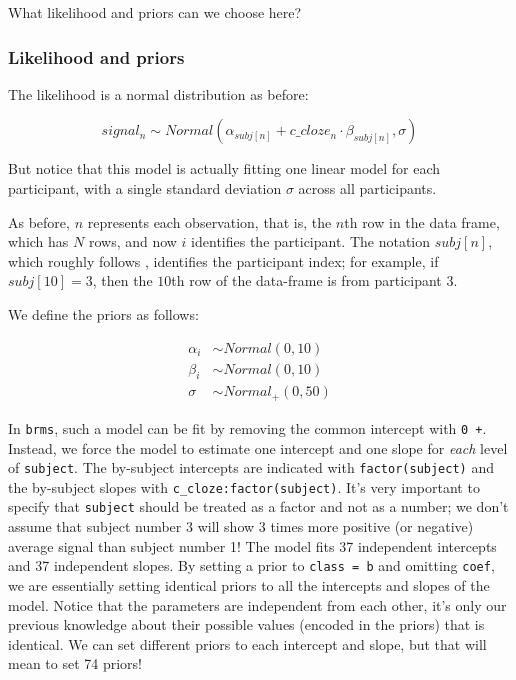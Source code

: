 \documentclass[12pt,]{krantz}
\theoremstyle{definition}
\theoremstyle{definition}
\theoremstyle{definition}
\theoremstyle{remark}
\begin{document}
What likelihood and priors can we choose here?

\hypertarget{likelihood-and-priors-2}{%
\subsubsection{Likelihood and priors}\label{likelihood-and-priors-2}}

The likelihood is a normal distribution as before:

\begin{equation}
 signal_n \sim Normal( \alpha_{subj[n]} + c\_cloze_n \cdot \beta_{subj[n]},\sigma)
 \end{equation}

But notice that this model is actually fitting one linear model for each participant, with a single standard deviation \(\sigma\) across all participants.

As before, \(n\) represents each observation, that is, the \(n\)th row in the data frame, which has \(N\) rows, and now \(i\) identifies the participant. The notation \(subj[n]\), which roughly follows \citet{GelmanHill2007}, identifies the participant index; for example, if \(subj[10]=3\), then the \(10\)th row of the data-frame is from participant \(3\).

We define the priors as follows:

\begin{equation}
 \begin{aligned}
 \alpha_i &\sim Normal(0,10)\\
 \beta_i  &\sim Normal(0,10)\\
 \sigma  &\sim Normal_+(0,50)
 \end{aligned}
 \end{equation}

In \texttt{brms}, such a model can be fit by removing the common intercept with \texttt{0\ +}. Instead, we force the model to estimate one intercept and one slope for \emph{each} level of \texttt{subject}. The by-subject intercepts are indicated with \texttt{factor(subject)} and the by-subject slopes with \texttt{c\_cloze:factor(subject)}. It's very important to specify that \texttt{subject} should be treated as a factor and not as a number; we don't assume that subject number 3 will show 3 times more positive (or negative) average signal than subject number 1! The model fits 37 independent intercepts and 37 independent slopes. By setting a prior to \texttt{class\ =\ b} and omitting \texttt{coef}, we are essentially setting identical priors to all the intercepts and slopes of the model. Notice that the parameters are independent from each other, it's only our previous knowledge about their possible values (encoded in the priors) that is identical. We can set different priors to each intercept and slope, but that will mean to set 74 priors!
\end{document}
